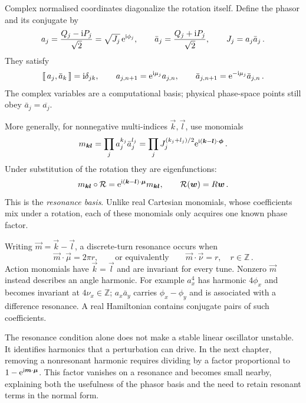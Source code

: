 Complex normalised coordinates diagonalize the rotation itself. Define
the phasor and its conjugate by
\begin{equation}\label{eq:lnf-phasor}
    a_j = \frac{Q_j-\mathrm{i} P_j}{\sqrt2} = \sqrt{J_j}\,\mathrm{e}^{\mathrm{i}\phi_j},\qquad
    \bar a_j = \frac{Q_j + \mathrm{i} P_j}{\sqrt2},\qquad
    J_j = a_j\bar a_j\,.
\end{equation}
They satisfy
\begin{equation}
    \llbracket \, a_j,\bar a_k\,\rrbracket = \mathrm{i}\delta_{jk},\qquad
    a_{j,n + 1} = \mathrm{e}^{\mathrm{i}\mu_j}a_{j,n},\qquad
    \bar a_{j,n + 1} = \mathrm{e}^{-\mathrm{i}\mu_j}\bar a_{j,n}\,.
\end{equation}
The complex variables are a computational basis; physical phase-space
points still obey $\bar a_j = \overline{a_j}$.

More generally, for nonnegative multi-indices
$\vec k,\vec l$, use monomials
\begin{equation}\label{eq:lnf-resonance-monomial}
    m_{\bm{k}\bm{l}} = \prod_j a_j^{k_j}\bar a_j^{l_j} = \prod_j J_j^{(k_j + l_j)/2}
    \mathrm{e}^{\mathrm{i}(\bm{k}-\bm{l})\cdot\bm{\phi}}\,.
\end{equation}
Under substitution of the rotation they are eigenfunctions:
\begin{equation}\label{eq:lnf-resonance-basis}
    m_{\bm{k}\bm{l}}\circ\mathcal R = \mathrm{e}^{\mathrm{i}(\bm{k}-\bm{l})\cdot\bm{\mu}}
    m_{\bm{k}\bm{l}},
    \qquad \mathcal R(\bm{w}) = R\bm{w}\,.
\end{equation}
This is the \emph{resonance basis}. Unlike real Cartesian monomials,
whose coefficients mix under a rotation, each of these monomials only
acquires one known phase factor.

Writing $\vec m = \vec k-\vec l$, a discrete-turn
resonance occurs when
\begin{equation}\label{eq:lnf-resonance}
    \vec m\cdot\vec\mu = 2\pi r,
    \qquad\text{or equivalently}\qquad
    \vec m\cdot\vec\nu = r,
    \quad r\in\mathbb Z\,.
\end{equation}
Action monomials have $\vec k = \vec l$ and are invariant
for every tune. Nonzero $\vec m$ instead describes an angle
harmonic. For example $a_x^4$ has harmonic $4\phi_x$ and becomes
invariant at $4\nu_x\in\mathbb Z$; $a_x\bar a_y$ carries
$\phi_x-\phi_y$ and is associated with a difference resonance.
A real Hamiltonian contains conjugate pairs of such coefficients.

The resonance condition alone does not make a stable linear oscillator
unstable. It identifies harmonics that a perturbation can drive.
In the next chapter, removing a nonresonant harmonic requires dividing
by a factor proportional to
$1-\mathrm{e}^{\mathrm{i}\bm{m}\cdot\bm{\mu}}$.
This factor vanishes on a resonance and becomes small nearby, explaining
both the usefulness of the phasor basis and the need to retain resonant
terms in the normal form.



